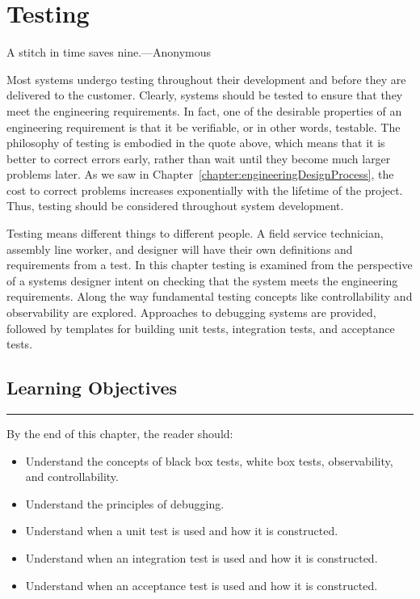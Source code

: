 \chapter{Testing}
\label{chapter:testing}
\graphicspath{ {./chapter07/Fig} }

\begin{itquote}
A stitch in time saves nine.---Anonymous
\end{itquote}


Most systems undergo testing throughout their development and before
they are delivered to the customer. Clearly, systems should be tested to
ensure that they meet the engineering requirements. In fact, one of the
desirable properties of an engineering requirement is that it be
verifiable, or in other words, testable. The philosophy of testing is
embodied in the quote above, which means that it is better to correct
errors early, rather than wait until they become much larger problems
later. As we saw in Chapter~\ref{chapter:engineeringDesignProcess}, 
the cost to correct problems increases
exponentially with the lifetime of the project. Thus, testing should be
considered throughout system development.

Testing means different things to different people. A field service
technician, assembly line worker, and designer will have their own
definitions and requirements from a test. In this chapter testing is
examined from the perspective of a systems designer intent on checking
that the system meets the engineering requirements. Along the way
fundamental testing concepts like controllability and observability are
explored. Approaches to debugging systems are provided, followed by
templates for building unit tests, integration tests, and acceptance
tests.

\section*{Learning Objectives}
\noindent\rule{\linewidth}{1pt}
By the end of this chapter, the reader should:

\begin{itemize}
\item
  Understand the concepts of black box tests, white box tests,
  observability, and controllability.
\item
  Understand the principles of debugging.
\item
  Understand when a unit test is used and how it is constructed.
\item
  Understand when an integration test is used and how it is constructed.
\item
  Understand when an acceptance test is used and how it is constructed.
\end{itemize}

